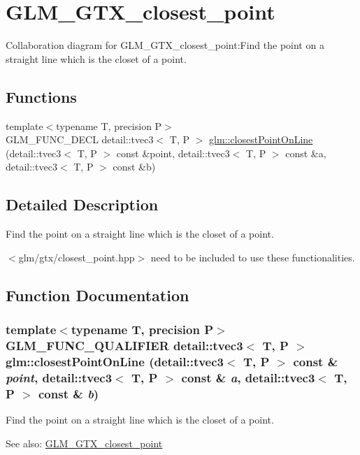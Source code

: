 \hypertarget{group__gtx__closest__point}{
\section{GLM\_\-GTX\_\-closest\_\-point}
\label{group__gtx__closest__point}
}


Collaboration diagram for GLM\_\-GTX\_\-closest\_\-point:Find the point on a straight line which is the closet of a point.  
\subsection*{Functions}
\begin{CompactItemize}
\item 
{\footnotesize template$<$typename T, precision P$>$ }\\GLM\_\-FUNC\_\-DECL detail::tvec3$<$ T, P $>$ \hyperlink{group__gtx__closest__point_g2fe2729eb32015953823c96c2e15daf9}{glm::closestPointOnLine} (detail::tvec3$<$ T, P $>$ const \&point, detail::tvec3$<$ T, P $>$ const \&a, detail::tvec3$<$ T, P $>$ const \&b)
\end{CompactItemize}


\subsection{Detailed Description}
Find the point on a straight line which is the closet of a point. 

$<$glm/gtx/closest\_\-point.hpp$>$ need to be included to use these functionalities. 

\subsection{Function Documentation}
\hypertarget{group__gtx__closest__point_g2fe2729eb32015953823c96c2e15daf9}{
\subsubsection[closestPointOnLine]{\setlength{\rightskip}{0pt plus 5cm}template$<$typename T, precision P$>$ GLM\_\-FUNC\_\-QUALIFIER detail::tvec3$<$ T, P $>$ glm::closestPointOnLine (detail::tvec3$<$ T, P $>$ const \& {\em point}, \/  detail::tvec3$<$ T, P $>$ const \& {\em a}, \/  detail::tvec3$<$ T, P $>$ const \& {\em b})}}
\label{group__gtx__closest__point_g2fe2729eb32015953823c96c2e15daf9}


Find the point on a straight line which is the closet of a point. \begin{Desc}
\item[See also:]\hyperlink{group__gtx__closest__point}{GLM\_\-GTX\_\-closest\_\-point} \end{Desc}
